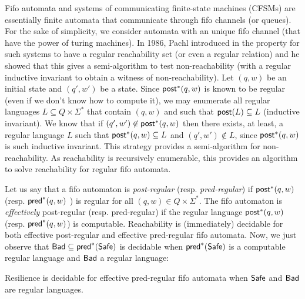 Fifo automata and systems of communicating finite-state machines (CFSMs) are essentially finite automata that communicate through fifo channels (or queues). For the sake of simplicity, we consider automata with an unique fifo channel (that have the power of turing machines). In 1986, Pachl introduced in \cite{} the property for such systems to have a regular reachability set (or even a regular relation) and he showed that this gives a semi-algorithm to test non-reachability (with a regular inductive invariant to obtain a witness of non-reachability). Let $(q,w)$ be an initial state and $(q',w')$ be a state. Since $\textsf{post}^*(q,w)$ is known to be regular (even if we don't know how to compute it), we may enumerate all regular languages $L \subseteq Q \times \Sigma^*$ that contain $(q,w)$ and such that $\textsf{post}(L) \subseteq L$ (inductive invariant). We know that if $(q',w') \not\in \textsf{post}^*(q,w)$ then there exists, at least, a regular language $L$ such that $\textsf{post}^*(q,w) \subseteq L$ and $(q',w') \not\in L$, since $\textsf{post}^*(q,w)$ is such inductive invariant. This strategy provides a semi-algorithm for non-reachability.
As reachability is recursively enumerable, this provides an algorithm to solve reachability for regular fifo automata.

Let us say that a fifo automaton is \emph{post-regular} (resp. \emph{pred-regular}) if $\textsf{post}^*(q,w)$ (resp. $\textsf{pred}^*(q,w)$ ) is regular for all $(q,w) \in Q \times \Sigma^*$. The  fifo automaton is \emph{effectively} post-regular (resp. pred-regular) if the regular language $\textsf{post}^*(q,w)$ (resp. $\textsf{pred}^*(q,w)$) is computable. Reachability is (immediately) decidable for both effective post-regular and effective pred-regular fifo automata.
%
%
%
Now, we just observe that $\textsf{Bad} \subseteq \textsf{pred}^*(\textsf{Safe})$ is decidable when $\textsf{pred}^*(\textsf{Safe})$ is a computable regular language and $\textsf{Bad}$ a regular language: 

\begin{theorem}{}
Resilience is decidable for effective pred-regular fifo automata when $\textsf{Safe}$ and $\textsf{Bad}$ are regular languages.
\end{theorem} 

